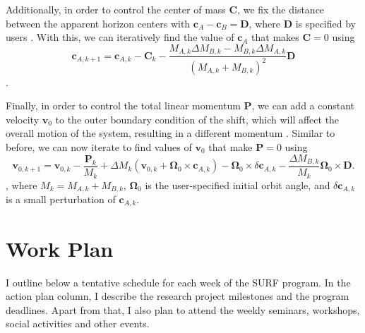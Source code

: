 \documentclass{../document}
\renewcommand{\v}[1]{\boldsymbol{#1}}
\begin{document}
	Additionally, in order to control the center of mass $\v C$, we fix the distance between the apparent horizon centers with $\v c_A - \v c_B = \v D$, where $\v D$ is specified by users \cite{Serguei}. With this, we can iteratively find the value of $\v c_A$ that makes $\v C = 0$ using
	\begin{equation}
		\v c_{A,k+1} = \v c_{A,k} - \v C_k - \frac{M_{A,k}  \Delta M_{B,k} - M_{B,k} \Delta M_{A,k}}{(M_{A,k} + M_{B,k})^2} \v D
	\end{equation}
	\cite{Serguei}.

	Finally, in order to control the total linear momentum $\v P$, we can add a constant velocity $\v v_0$ to the outer boundary condition of the shift, which will affect the overall motion of the system, resulting in a different momentum \cite{Serguei}. Similar to before, we can now iterate to find values of $\v v_0$ that make $\v P = 0$ using
	\begin{equation}
			\v v_{0,k+1} = \v v_{0,k} - \frac{\v P_k}{M_k} + \Delta M_k (\v v_{0,k} + \v\Omega_0 \times \v c_{A,k}) - \v\Omega_0 \times \delta \v c_{A,k} - \frac{\Delta M_{B,k}}{M_k} \v\Omega_0 \times \v D.
		\end{equation}
	\cite{Serguei}, where $M_k = M_{A,k} + M_{B,k}$, $\v \Omega_0$ is the user-specified initial orbit angle, and $\delta \v c_{A,k}$ is a small perturbation of $\v c_{A,k}$.

	\section{Work Plan}

	I outline below a tentative schedule for each week of the SURF program. In the action plan column, I describe the research project milestones and the program deadlines. Apart from that, I also plan to attend the weekly seminars, workshops, social activities and other events.
\end{document}
